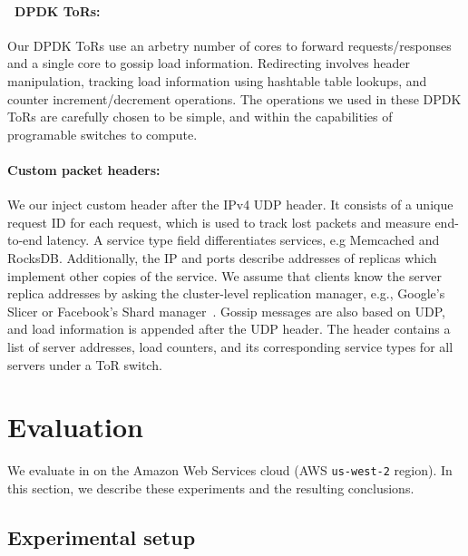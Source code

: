 \paragraph{\toolname\ DPDK ToRs:} Our DPDK ToRs use an arbetry number
of cores to forward requests/responses and a single core to gossip
load information. Redirecting involves header manipulation, tracking
load information using hashtable table lookups, and counter
increment/decrement operations. The operations we used in these DPDK
ToRs are carefully chosen to be simple, and within the capabilities of
programable switches to compute.

\paragraph{Custom packet headers:} We our inject custom header after
the IPv4 UDP header. It consists of a unique request ID for each
request, which is used to track lost packets and measure end-to-end
latency. A service type field differentiates services, e.g Memcached
and RocksDB.  Additionally, the IP and ports describe addresses of
replicas which implement other copies of the service.  We assume that
clients know the server replica addresses by asking the cluster-level
replication manager, e.g., Google's Slicer or Facebook's Shard
manager~\cite{facebook_shard,google_slicer,microsoft_service_fabric}.
Gossip messages are also based on UDP, and load information is
appended after the UDP header.  The header contains a list of server
addresses, load counters, and its corresponding service types for all
servers under a ToR switch. 

\section{Evaluation}
\label{sec:eval}

\newcommand{\instances}{9 }
\newcommand{\racks}{3 }
\newcommand{\servers}{3 }
\newcommand{\servercores}{1 }
\newcommand{\tors}{3 }
\newcommand{\torscores}{8 }
\newcommand{\clients}{3 }
\newcommand{\clientcores}{1 }

We evaluate \systemname in on the Amazon Web Services cloud (AWS
\texttt{us-west-2} region). In this section, we describe these experiments and
the resulting conclusions.

\subsection{Experimental setup}

